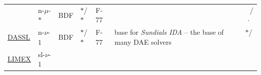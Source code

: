 \documentclass[]{book}
\theoremstyle{definition}
\theoremstyle{definition}
\theoremstyle{definition}
\theoremstyle{remark}
\begin{document}
\begin{longtable}[]{@{}llllllc@{}}
\begin{minipage}[t]{0.06\columnwidth}
\end{minipage} & \begin{minipage}[t]{0.06\columnwidth}\raggedright
n-\(\mu\)-\(*\)\strut
\end{minipage} & \begin{minipage}[t]{0.10\columnwidth}\raggedright
BDF\strut
\end{minipage} & \begin{minipage}[t]{0.05\columnwidth}\raggedright
\(*\)/\(*\)\strut
\end{minipage} & \begin{minipage}[t]{0.06\columnwidth}\raggedright
F-77\strut
\end{minipage} & \begin{minipage}[t]{0.41\columnwidth}\raggedright
\strut
\end{minipage} & \begin{minipage}[t]{0.05\columnwidth}\centering
\(\phantom{*}\)/\(\cdot\)\strut
\end{minipage}\tabularnewline
\begin{minipage}[t]{0.06\columnwidth}\raggedright
\href{http://www.netlib.org/ode/ddassl.f}{DASSL}\strut
\end{minipage} & \begin{minipage}[t]{0.06\columnwidth}\raggedright
n-\(\nu\)-\(1\)\strut
\end{minipage} & \begin{minipage}[t]{0.10\columnwidth}\raggedright
BDF\strut
\end{minipage} & \begin{minipage}[t]{0.05\columnwidth}\raggedright
\(*\)/\(*\)\strut
\end{minipage} & \begin{minipage}[t]{0.06\columnwidth}\raggedright
F-77\strut
\end{minipage} & \begin{minipage}[t]{0.41\columnwidth}\raggedright
base for \emph{Sundials IDA} -- the base of many DAE solvers\strut
\end{minipage} & \begin{minipage}[t]{0.05\columnwidth}\centering
\(*\)/\(\phantom{\cdot}\)\strut
\end{minipage}\tabularnewline
\begin{minipage}[t]{0.06\columnwidth}\raggedright
\href{https://doi.org/10.1007/BF01400352}{LIMEX}\strut
\end{minipage} & \begin{minipage}[t]{0.06\columnwidth}\raggedright
sl-\(\nu\)-\(1\)\strut

\end{minipage}
\end{longtable}
\end{document}

